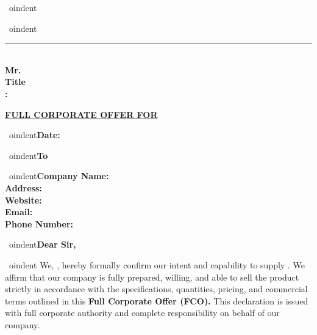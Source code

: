 \documentclass[a4paper,11pt]{article}
\begin{document}
\vspace{2.5cm}

\
oindent\textbf{\underline{}}

\vspace{2.5cm}

\
oindent\rule{7cm}{0.4pt}\\[4pt]
\textbf{Mr.}\\
\textbf{Title}\\
\textbf{:}


\setlength{\parindent}{0pt}

\begin{center}
  {\Large\textbf{\underline{FULL CORPORATE OFFER FOR }}}
\end{center}

\vspace{0.3cm}

\
oindent\textbf{Date: } \hfill \textbf{}

\vspace{0.5cm}

\
oindent\textbf{To}

\vspace{0.2cm}

\
oindent\textbf{Company Name:} \\
\textbf{Address:} \\
\textbf{Website:} \\
\textbf{Email:} \\
\textbf{Phone Number:} 

\vspace{0.4cm}

\
oindent\textbf{Dear Sir,}

\vspace{0.3cm}

\
oindent We, \textbf{}, hereby formally confirm our intent and capability to supply \textbf{}. We affirm that our company is fully prepared, willing, and able to sell the product strictly in accordance with the specifications, quantities, pricing, and commercial terms outlined in this \textbf{Full Corporate Offer (FCO).} This declaration is issued with full corporate authority and complete responsibility on behalf of our company.

\vspace{0.4cm}
\end{document}
